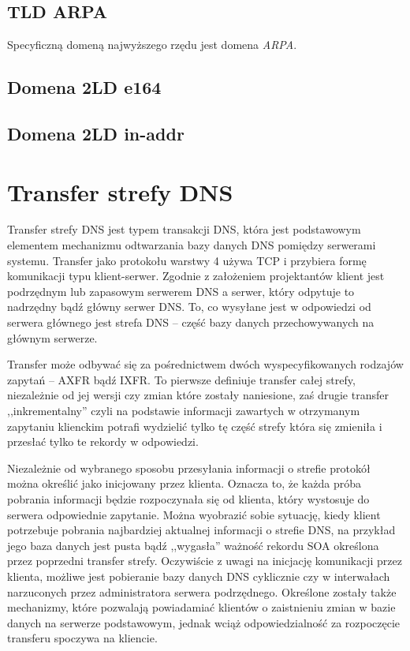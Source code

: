 \subsection{TLD ARPA}
Specyficzną domeną najwyższego rzędu jest domena \textit{ARPA}.

\subsection{Domena 2LD e164}

\subsection{Domena 2LD in-addr}

\section{Transfer strefy DNS}
Transfer strefy DNS jest typem transakcji DNS, która jest podstawowym elementem mechanizmu odtwarzania bazy danych DNS pomiędzy serwerami systemu. Transfer jako protokołu warstwy 4 używa TCP i przybiera formę komunikacji typu klient-serwer. Zgodnie z założeniem projektantów klient jest podrzędnym lub zapasowym serwerem DNS a serwer, który odpytuje to nadrzędny bądź główny serwer DNS. To, co wysyłane jest w odpowiedzi od serwera głównego jest strefa DNS -- część bazy danych przechowywanych na głównym serwerze.

Transfer może odbywać się za pośrednictwem dwóch wyspecyfikowanych rodzajów zapytań -- AXFR\cite{RFC1034, RFC5936} bądź IXFR\cite{RFC1995}. To pierwsze definiuje transfer całej strefy, niezależnie od jej wersji czy zmian które zostały naniesione, zaś drugie transfer ,,inkrementalny'' czyli na podstawie informacji zawartych w otrzymanym zapytaniu klienckim potrafi wydzielić tylko tę część strefy która się zmieniła i przesłać tylko te rekordy w odpowiedzi.

Niezależnie od wybranego sposobu przesyłania informacji o strefie protokół można określić jako inicjowany przez klienta. Oznacza to, że każda próba pobrania informacji będzie rozpoczynała się od klienta, który wystosuje do serwera odpowiednie zapytanie. Można wyobrazić sobie sytuację, kiedy klient potrzebuje pobrania najbardziej aktualnej informacji o strefie DNS, na przykład jego baza danych jest pusta bądź ,,wygasła'' ważność rekordu SOA określona przez poprzedni transfer strefy. Oczywiście z uwagi na inicjację komunikacji przez klienta, możliwe jest pobieranie bazy danych DNS cyklicznie czy w interwałach narzuconych przez administratora serwera podrzędnego. Określone zostały także mechanizmy, które pozwalają powiadamiać klientów o zaistnieniu zmian w bazie danych na serwerze podstawowym\cite{RFC5936, RFC1996}, jednak wciąż odpowiedzialność za rozpoczęcie transferu spoczywa na kliencie.

